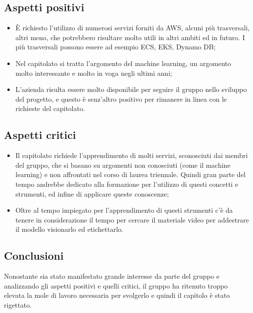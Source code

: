 \subsection{Aspetti positivi}
\begin{itemize}
\item \`E richiesto l'utilizzo di numerosi servizi forniti da AWS, alcuni pi\`u trasversali, altri meno, che potrebbero risultare molto utili in altri ambiti ed in futuro. I pi\`u  trasversali possono essere ad esempio ECS, EKS, Dynamo DB;
\item Nel capitolato si tratta l'argomento del machine learning, un argomento molto interessante e molto in voga negli ultimi anni;
\item L'azienda risulta essere molto disponibile per seguire il gruppo nello sviluppo del progetto, e questo \`e senz'altro positivo per rimanere in linea con le richieste del capitolato.
\end{itemize}

\subsection{Aspetti critici}
\begin{itemize}
\item Il capitolato richiede l'apprendimento di molti servizi, sconosciuti dai membri del gruppo, che si basano su argomenti non conosciuti (come il machine learning) e non affrontati nel corso di laurea triennale. Quindi gran parte del tempo andrebbe dedicato alla formazione per l'utilizzo di questi concetti e strumenti, ed infine di applicare queste conoscenze;
\item Oltre al tempo impiegato per l'apprendimento di questi strumenti c'\`e da tenere in considerazione il tempo per cercare il materiale video per addestrare il modello visionarlo ed etichettarlo.
\end{itemize}

\subsection{Conclusioni}
Nonostante sia stato manifestato grande interesse da parte del gruppo e analizzando gli aspetti positivi e quelli critici, il gruppo ha ritenuto troppo elevata la mole di lavoro necessaria per svolgerlo e quindi il capitolo \`e stato rigettato.

